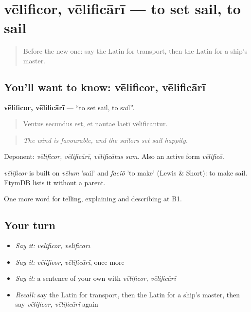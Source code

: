 \section[vēlificor, vēlificārī]{vēlificor, vēlificārī — to set sail, to sail}

\label{lesson:LA-C438-velificor}



\begin{quote}
Before the new one: say the Latin for transport, then the Latin for a ship's master.
\end{quote}

\subsection*{You'll want to know: vēlificor, vēlificārī}
\textbf{vēlificor, vēlificārī} — \textquotedblleft{}to set sail, to sail\textquotedblright{}.

\begin{quote}
Ventus secundus est, et nautae laetī vēlificantur.
\end{quote}

\begin{quote}
\emph{The wind is favourable, and the sailors set sail happily.}
\end{quote}

Deponent: \emph{vēlificor, vēlificārī, vēlificātus sum}. Also an active form \emph{vēlificō}.

\begin{cousinweb}
\emph{vēlificor} is built on \emph{vēlum} 'sail' and \emph{faciō} 'to make' (Lewis \& Short): to make sail. EtymDB lists it without a parent.
\end{cousinweb}

\begin{grammarlens}[title={What you've built}]
One more word for telling, explaining and describing at B1.
\end{grammarlens}

\subsection*{Your turn}
\begin{itemize}
\raggedright
  \item \emph{Say it:} \emph{vēlificor, vēlificārī}
  \item \emph{Say it:} \emph{vēlificor, vēlificārī}, once more
  \item \emph{Say it:} a sentence of your own with \emph{vēlificor, vēlificārī}
  \item \emph{Recall:} say the Latin for transport, then the Latin for a ship's master, then say \emph{vēlificor, vēlificārī} again
\end{itemize}

